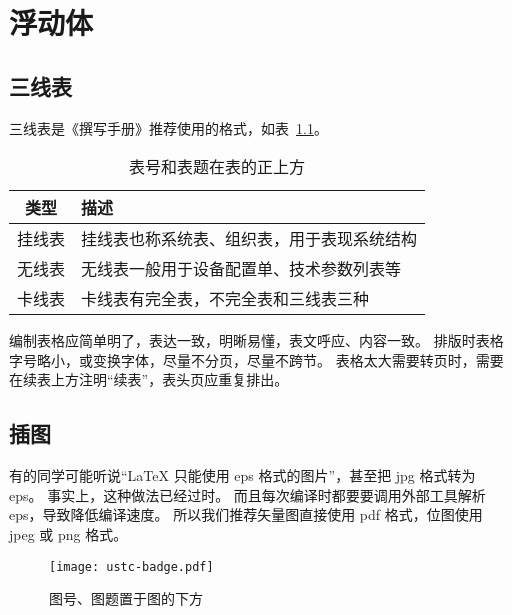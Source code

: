 
\chapter{浮动体}

\section{三线表}

三线表是《撰写手册》推荐使用的格式，如表~\ref{tab:exampletable}。
\begin{table}[htb]
  \centering\small
  \caption{表号和表题在表的正上方}
  \label{tab:exampletable}
  \begin{tabular}{cl}
    \toprule
    类型   & 描述                                       \\
    \midrule
    挂线表 & 挂线表也称系统表、组织表，用于表现系统结构 \\
    无线表 & 无线表一般用于设备配置单、技术参数列表等   \\
    卡线表 & 卡线表有完全表，不完全表和三线表三种       \\
    \bottomrule
  \end{tabular}
\end{table}

编制表格应简单明了，表达一致，明晰易懂，表文呼应、内容一致。
排版时表格字号略小，或变换字体，尽量不分页，尽量不跨节。
表格太大需要转页时，需要在续表上方注明“续表”，表头页应重复排出。



\section{插图}

有的同学可能听说“\LaTeX{} 只能使用 eps 格式的图片”，甚至把 jpg 格式转为 eps。
事实上，这种做法已经过时。
而且每次编译时都要要调用外部工具解析 eps，导致降低编译速度。
所以我们推荐矢量图直接使用 pdf 格式，位图使用 jpeg 或 png 格式。
\begin{figure}[htb]
  \centering
  \texttt{[image: ustc-badge.pdf]}
  \caption{图号、图题置于图的下方}
  \label{fig:badge}
\end{figure}

